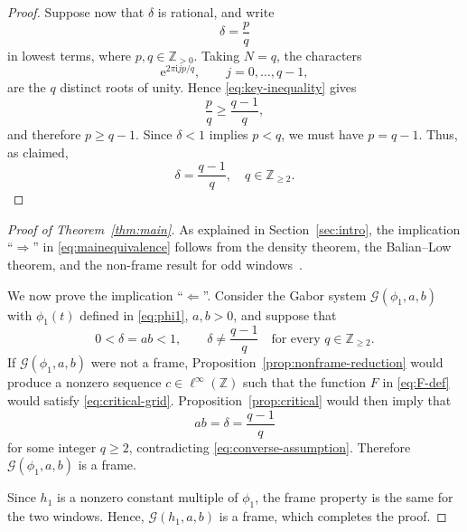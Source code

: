 \documentclass[11pt]{amsart}
\numberwithin{equation}{section}
\theoremstyle{definition}
\theoremstyle{remark}
\newcommand{\Z}{\mathbb Z}
\newcommand{\ii}{\mathrm i}
\newcommand{\e}{\mathrm e}
\newcommand{\cG}{\mathcal G}
\begin{document}
\begin{proof}
    Suppose now that $\delta$ is rational, and write
    \begin{equation}
        \delta=\frac pq
    \end{equation}
    in lowest terms, where $p,q\in\Z_{>0}$. Taking $N=q$, the characters
    \begin{equation}
        \e^{2\pi\ii jp/q},
        \qquad j=0,\ldots,q-1,
    \end{equation}
    are the $q$ distinct roots of unity. Hence \eqref{eq:key-inequality} gives
    \begin{equation}
        \frac pq\geq\frac{q-1}{q},
    \end{equation}
    and therefore $p\geq q-1$. Since $\delta<1$ implies $p<q$, we must have $p=q-1$. Thus, as claimed,
    \begin{equation}
        \delta=\frac{q-1}{q}, \quad q \in \Z_{\geq 2}.
    \end{equation}
\end{proof}

\begin{proof}[Proof of Theorem~\ref{thm:main}]
    As explained in Section~\ref{sec:intro}, the implication ``$\Longrightarrow$'' in \eqref{eq:mainequivalence} follows from the density theorem, the Balian--Low theorem, and the non-frame result for odd windows~\cite{LN}.
    
    We now prove the implication ``$\Longleftarrow$''. Consider the Gabor system $\cG(\phi_1,a,b)$ with $\phi_1(t)$ defined in \eqref{eq:phi1}, $a,b > 0$, and suppose that
    \begin{equation}\label{eq:converse-assumption}
        0<\delta=ab<1,
        \qquad
        \delta\neq\frac{q-1}{q}
        \quad\text{for every }q\in\Z_{\geq2}.
    \end{equation}
    If $\cG(\phi_1,a,b)$ were not a frame, Proposition~\ref{prop:nonframe-reduction} would produce a nonzero sequence $c\in\ell^\infty(\Z)$ such that the function $F$ in \eqref{eq:F-def} would satisfy \eqref{eq:critical-grid}. Proposition~\ref{prop:critical} would then imply that
    \begin{equation}
        ab = \delta=\frac{q-1}{q}
    \end{equation}
    for some integer $q\geq2$, contradicting \eqref{eq:converse-assumption}. Therefore $\cG(\phi_1,a,b)$ is a frame.
    
    Since $h_1$ is a nonzero constant multiple of $\phi_1$, the frame property is the same for the two windows. Hence, $\cG(h_1,a,b)$ is a frame, which completes the proof.
\end{proof}


\renewcommand{\bibfont}{\footnotesize}


\end{document}
